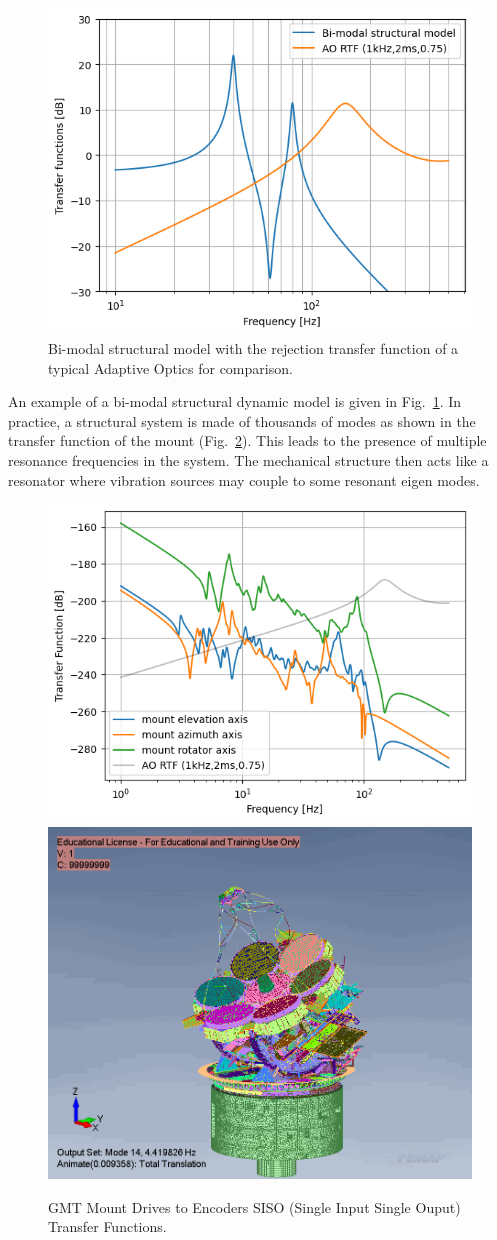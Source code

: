 \documentclass[]{AO4ELT}  %
\begin{document}
\begin{figure}
   \centering
   \includegraphics[width=0.5\linewidth]{./figures/bi-modal_sm.png}
   \caption{Bi-modal structural model with the rejection transfer function of a typical Adaptive Optics for comparison.}
   \label{fig:90}
\end{figure}

An example of a bi-modal structural dynamic model is given in Fig.~\ref{fig:90}.
In practice, a structural system is made of thousands of modes as shown in the transfer function of the mount (Fig.~\ref{fig:9}).
This leads to the presence of multiple resonance frequencies in the system.
The mechanical structure then acts like a resonator where vibration sources may couple to some resonant eigen modes.


\begin{figure}
   \centering
   \includegraphics[width=0.495\linewidth]{./figures/mount-axis-tfs.png}
   \includegraphics[width=0.4\linewidth]{./figures/fem-mode-9.png}
   \caption{GMT Mount Drives to Encoders SISO (Single Input Single Ouput) Transfer Functions.}
   \label{fig:9}
\end{figure}
\end{document}
